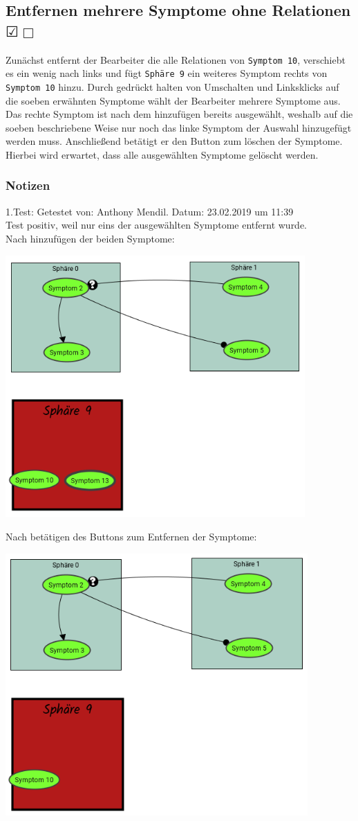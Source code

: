 \documentclass{scrartcl}
\newcommand{\subsectiont}[2]{\subsection[#1]{#1{\normalsize\normalfont #2}}}
\newcommand{\leer}{$\Box$}
\newcommand{\ok}{$\CheckedBox$}
\begin{document}
\subsectiont{Entfernen mehrere Symptome ohne Relationen}{\dotfill\XBox\ok\leer}
Zunächst entfernt der Bearbeiter die alle Relationen von \texttt{Symptom 10}, verschiebt es ein wenig nach links und fügt \texttt{Sphäre 9} ein weiteres Symptom rechts von \texttt{Symptom 10} hinzu. 
Durch gedrückt halten von Umschalten und Linksklicks auf die soeben erwähnten Symptome wählt der Bearbeiter mehrere Symptome aus. Das rechte Symptom ist nach dem hinzufügen bereits ausgewählt, weshalb auf die soeben beschriebene Weise nur noch das linke Symptom der Auswahl hinzugefügt werden muss. Anschließend betätigt er den Button zum löschen der Symptome. Hierbei wird erwartet, dass alle ausgewählten Symptome gelöscht werden. 
\subsubsection{Notizen}
1.Test: Getestet von: Anthony Mendil. Datum: 23.02.2019 um 11:39 \\
Test positiv, weil nur eins der ausgewählten Symptome entfernt wurde. \\
Nach hinzufügen der beiden Symptome: 
\begin{center}
\includegraphics[height=10cm]{2_22vorher.PNG}
\end{center}
Nach betätigen des Buttons zum Entfernen der Symptome: 
\begin{center}
\includegraphics[height=10cm]{2_22nachher.PNG}
\end{center}
\end{document}
